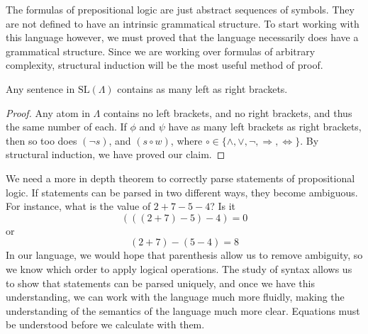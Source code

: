 The formulas of prepositional logic are just abstract sequences of symbols. They are not defined to have an intrinsic grammatical structure. To start working with this language however, we must proved that the language necessarily does have a grammatical structure. Since we are working over formulas of arbitrary complexity, structural induction will be the most useful method of proof.

\begin{theorem}
    Any sentence in $\text{SL}(\Lambda)$ contains as many left as right brackets.
\end{theorem}
\begin{proof}
    Any atom in $\Lambda$ contains no left brackets, and no right brackets, and thus the same number of each. If $\phi$ and $\psi$ have as many left brackets as right brackets, then so too does $(\neg s)$, and $(s \circ w)$, where $\circ \in \{ \wedge, \vee, \neg, \Rightarrow, \Leftrightarrow \}$. By structural induction, we have proved our claim.
\end{proof}

We need a more in depth theorem to correctly parse statements of propositional logic. If statements can be parsed in two different ways, they become ambiguous. For instance, what is the value of $2 + 7 - 5 - 4$? Is it
%
\[ (((2 + 7) - 5) - 4) = 0 \]
%
or
%
\[ (2 + 7) - (5 - 4) = 8 \]
%
In our language, we would hope that parenthesis allow us to remove ambiguity, so we know which order to apply logical operations. The study of syntax allows us to show that statements can be parsed uniquely, and once we have this understanding, we can work with the language much more fluidly, making the understanding of the semantics of the language much more clear. Equations must be understood before we calculate with them.

